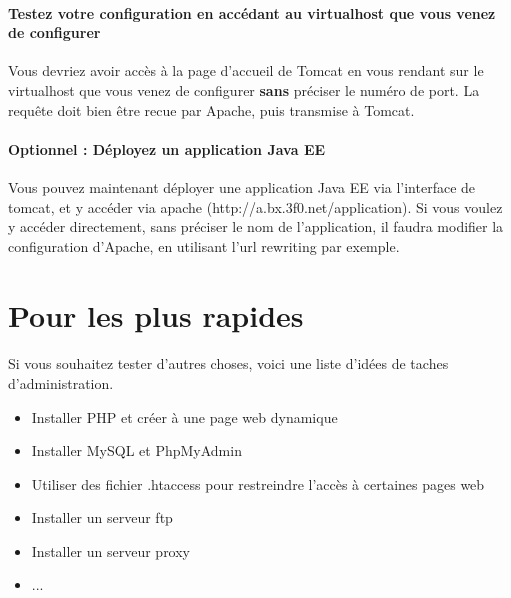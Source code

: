 \documentclass[12pt,a4paper]{article}
\begin{document}
\paragraph{Testez votre configuration en accédant au virtualhost que vous venez de configurer\\}
Vous devriez avoir accès à la page d'accueil de Tomcat en vous rendant sur le virtualhost que vous venez de configurer \textbf{sans} préciser le numéro de port. La requête doit bien être recue par Apache, puis transmise à Tomcat.

\paragraph{Optionnel : Déployez un application Java EE\\}
Vous pouvez maintenant déployer une application Java EE via l'interface de tomcat, et y accéder via apache (http://a.bx.3f0.net/application). Si vous voulez y accéder directement, sans préciser le nom de l'application, il faudra modifier la configuration d'Apache, en utilisant l'url rewriting par exemple.

\section{Pour les plus rapides}

\paragraph{}
Si vous souhaitez tester d'autres choses, voici une liste d'idées de taches d'administration.
\begin{itemize}
\item Installer PHP et créer à une page web dynamique
\item Installer MySQL et PhpMyAdmin
\item Utiliser des fichier .htaccess pour restreindre l'accès à certaines pages web
\item Installer un serveur ftp
\item Installer un serveur proxy
\item ...
\end{itemize}
\end{document}
